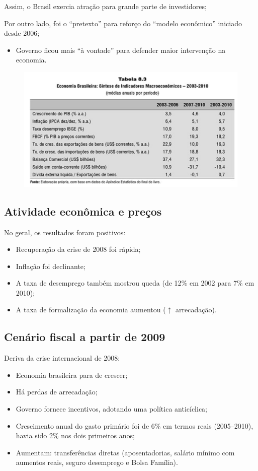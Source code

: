 \documentclass[a4paper,12pt]{article}[abntex2]
\begin{document}
Assim, o Brasil exercia atração para grande parte de investidores;

Por outro lado, foi o ``pretexto'' para reforço do ``modelo econômico'' iniciado desde 2006;
\begin{itemize}
    \item Governo ficou mais ``à vontade'' para defender maior intervenção na economia.
\end{itemize}

\begin{figure}[H]
    \centering
    \includegraphics[width=0.7\linewidth]{Imagens/a16i9.png}
\end{figure}

\subsection{\textbf{Atividade econômica e preços}}
No geral, os resultados foram positivos:
\begin{itemize}
    \item Recuperação da crise de 2008 foi rápida;
    \item Inflação foi declinante;
    \item A taxa de desemprego também mostrou queda (de 12\% em 2002 para 7\% em 2010);
    \item A taxa de formalização da economia aumentou ($\uparrow$ arrecadação).
\end{itemize}

\subsection{\textbf{Cenário fiscal a partir de 2009}}

Deriva da crise internacional de 2008:
\begin{itemize}
    \item Economia brasileira para de crescer;
    \item Há perdas de arrecadação;
    \item Governo fornece incentivos, adotando uma política anticíclica;
    \item Crescimento anual do gasto primário foi de 6\% em termos reais (2005--2010), havia sido 2\% nos dois primeiros anos;
    \item Aumentam: transferências diretas (aposentadorias, salário mínimo com aumentos reais, seguro desemprego e Bolsa Família).
\end{itemize}
\end{document}
